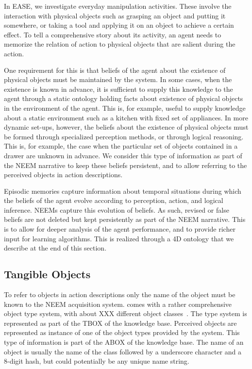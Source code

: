 
In EASE, we investigate everyday manipulation activities.
These involve the interaction with physical objects such as
grasping an object and putting it somewhere,
or taking a tool and applying it on an object to achieve a certain effect.
To tell a comprehensive story about its activity,
an agent needs to memorize the relation of action to
physical objects that are salient during the action.

One requirement for this is that beliefs of the agent about the existence
of physical objects must be maintained by the system.
In some cases, when the existence is known in advance,
it is sufficient to supply this knowledge to the agent through
a static ontology holding facts about existence of physical objects
in the environment of the agent.
This is, for example, useful to supply knowledge about a static
environment such as a kitchen with fixed set of appliances.
In more dynamic set-ups, however, the beliefs about the existence
of physical objects must be formed through specialized perception
methods, or through logical reasoning.
This is, for example, the case when the particular set of objects
contained in a drawer are unknown in advance.
We consider this type of information as part of the NEEM narrative
to keep these beliefs persistent, and to allow referring to
the perceived objects in action descriptions.

Episodic memories capture information about temporal situations
during which the beliefs of the agent evolve according to
perception, action, and logical inference.
NEEMs capture this evolution of beliefs.
As such, revised or false beliefs are not deleted but kept
persistently as part of the NEEM narrative.
This is to allow for deeper analysis of the agent performance,
and to provide richer input for learning algorithms.
This is realized through a 4D ontology that we describe at
the end of this section.

\subsection{Tangible Objects}
To refer to objects in action descriptions only the name of the 
object must be known to the NEEM acquisition system.
\knowrob comes with a rather comprehensive object type system,
with about XXX different object classes~\cite{knowrob-ontology}.
The type system is represented as part of the TBOX of the knowledge base.
Perceived objects are represented as instance of one of the object types
provided by the \knowrob system.
This type of information is part of the ABOX of the knowledge base.
The name of an object is usually the name of the class followed
by a underscore character and a 8-digit hash,
but could potentially be any unique name string.

